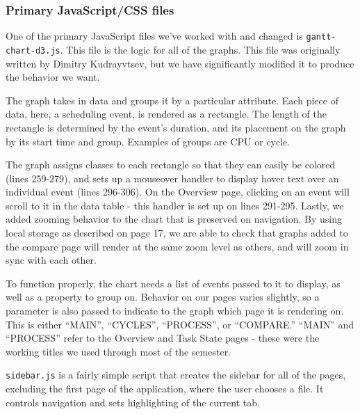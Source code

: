 \documentclass{hmcclinic}
\begin{document}
  \subsubsection{Primary JavaScript/CSS files}
  One of the primary JavaScript files we've worked
  with and changed is \texttt{gantt-chart-d3.js}. This file is the logic for all of the
  graphs. This file was originally written by Dimitry Kudrayvtsev, %
 but we have significantly modified it to produce the behavior we want.

  The graph takes in data and groups it by a particular attribute. Each piece
  of data, here, a scheduling event, is rendered as a rectangle. The
  length of the rectangle is determined by the event's duration, and its
  placement on the graph by its start time and group. Examples of groups are
  CPU or cycle.

  The graph assigns classes to each rectangle so that they can easily be
  colored (lines 259-279), and sets up a mouseover handler to display hover text
  over an individual event (lines 296-306). On the Overview page, clicking
  on an event will scroll to it in the data table - this handler is set up on
  lines 291-295. Lastly, we added zooming behavior to the chart that is
  preserved on navigation. By using local storage as described on page 17, we
  are able to check that graphs added to the compare page will render at the
  same zoom level as others, and will zoom in sync with each other.

  To function properly, the chart needs a list of events passed to it to
  display, as well as a property to group on. Behavior on our pages varies
  slightly, so a parameter is also passed to indicate to the graph which
  page it is rendering on. This is either ``MAIN'', ``CYCLES'', ``PROCESS'',
  or ``COMPARE.'' ``MAIN'' and ``PROCESS'' refer to the Overview and Task
  State pages - these were the working titles we used through most of the
  semester.

  \texttt{sidebar.js} is a fairly simple script that creates the sidebar for all of the
  pages, excluding the first page of the application, where the user chooses a file.
  It controls navigation and sets highlighting of the current tab.
\end{document}
